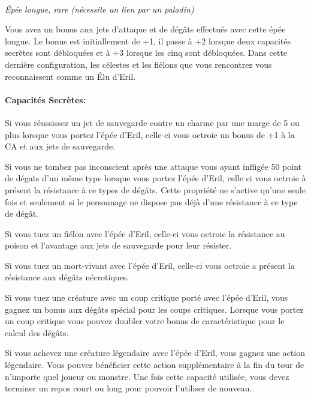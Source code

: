 \\
{\small \it Épée longue, rare (nécessite un lien par
un paladin)}\\
\label{EpeeEril}

Vous avez un bonus aux jets d'attaque et de dégâts effectués avec cette 
épée longue. Le bonus est initiallement de +1, il passe à +2 lorsque deux
capacités secrètes sont débloquées et à +3 lorsque les cinq sont débloquées.
Dans cette dernière configuration, les célestes et 
les fiélons que vous rencontrez vous reconnaissent comme un Élu d'Eril.

\paragraph{Capacités Secrètes:}

Si vous réussissez un jet de sauvegarde contre un charme par une marge
de 5 ou plus lorsque vous portez l'épée d'Eril, celle-ci vous octroie
un bonus de +1 à la CA et aux jets de sauvegarde.

Si vous ne tombez pas inconscient après une attaque vous ayant infligée
50 point de dégats d'un même type lorsque vous portez l'épée d'Eril,
celle ci vous octroie à présent la résistance à ce types de dégâts. Cette 
propriété ne s'active qu'une seule fois et seulement si le personnage ne
dispose pas déjà d'une résistance à ce type de dégât. 

Si vous tuez un fiélon avec l'épée d'Eril, celle-ci vous octroie
la résistance au poison et l'avantage aux jets de sauvegarde pour leur
résister.

Si vous tuez un mort-vivant avec l'épée d'Eril, celle-ci vous octroie
a présent la résistance aux dégâts nécrotiques.

Si vous tuez une créature avec un coup critique porté avec l'épée d'Eril,
vous gagnez un bonus aux dégâts spécial pour les coups critiques. Lorsque 
vous portez un coup critique
vous pouvez doubler votre bonus de caractéristique pour le calcul des dégâts.

Si vous achevez une créature légendaire avec l'épée d'Eril, vous gagnez
une action légendaire. Vous pouvez bénéficier cette action supplémentaire 
à la fin du tour de n'importe quel joueur ou monstre. Une fois cette capacité 
utilisée, vous devez terminer un repos court ou long pour pouvoir l'utiliser 
de nouveau.
